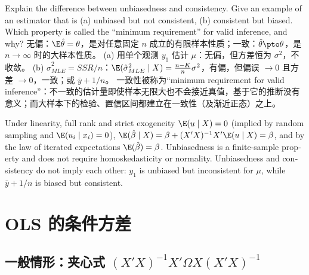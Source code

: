 \begin{prac}
Explain the difference between unbiasedness and consistency. Give an example of an estimator that is (a) unbiased but not consistent, (b) consistent but biased. Which property is called the ``minimum requirement'' for valid inference, and why?
\answer
无偏：$\E\hat\theta=\theta$，是对任意固定 $n$ 成立的有限样本性质；一致：$\hat\theta\pto\theta$，是 $n\to\infty$ 时的大样本性质。
(a) 用单个观测 $y_1$ 估计 $\mu$：无偏，但方差恒为 $\sigma^2$，不收敛。
(b) $\hat\sigma^2_{MLE}=SSR/n$：$\E(\hat\sigma^2_{MLE}\mid X)=\frac{n-K}{n}\sigma^2$，有偏，但偏误 $\to0$ 且方差 $\to0$，一致；或 $\bar y+1/n$。
一致性被称为“minimum requirement for valid inference”：不一致的估计量即使样本无限大也不会接近真值，基于它的推断没有意义；而大样本下的检验、置信区间都建立在一致性（及渐近正态）之上。
\end{prac}

\begin{english}
Under linearity, full rank and strict exogeneity $\E(u\mid X)=0$ (implied by random sampling and $\E(u_i\mid x_i)=0$), $\E(\hat\beta\mid X)=\beta+(X'X)^{-1}X'\E(u\mid X)=\beta$, and by the law of iterated expectations $\E(\hat\beta)=\beta$. Unbiasedness is a finite-sample property and does not require homoskedasticity or normality. Unbiasedness and consistency do not imply each other: $y_1$ is unbiased but inconsistent for $\mu$, while $\bar y+1/n$ is biased but consistent.
\end{english}

\section{OLS 的条件方差}\label{sec:U04-var}

\subsection{一般情形：夹心式 \texorpdfstring{$(X'X)^{-1}X'\Omega X(X'X)^{-1}$}{(X'X)\^{}-1 X'Omega X (X'X)\^{}-1}}

